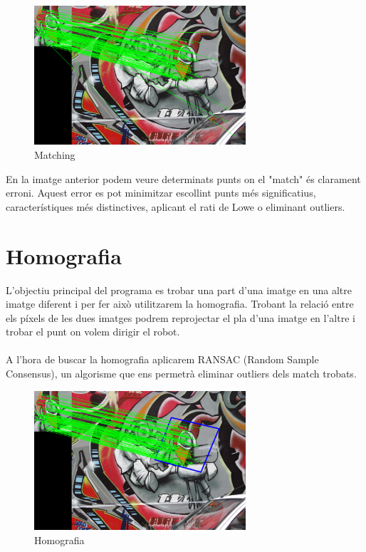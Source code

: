 	\begin{figure}[H]
		\centering
		\includegraphics[width=0.7\textwidth]{images/matching}
		\caption{Matching}
	\end{figure}

	En la imatge anterior podem veure determinats punts on el "match" és clarament erroni. Aquest error es pot minimitzar escollint punts més significatius, característiques més distinctives, aplicant el rati
	de Lowe o eliminant outliers.

\section{Homografia}

	L'objectiu principal del programa es trobar una part d'una imatge en una altre imatge diferent i per fer això utilitzarem la homografia. Trobant la relació entre els píxels de les dues imatges podrem
	reprojectar el pla d'una imatge en l'altre i trobar el punt on volem dirigir el robot.\\\\
	A l'hora de buscar la homografia aplicarem RANSAC (Random Sample Consensus), un algorisme que ens permetrà eliminar outliers dels match trobats.\\

	\begin{figure}[H]
		\centering
		\includegraphics[width=0.7\textwidth]{images/homography}
		\caption{Homografia}
	\end{figure}
